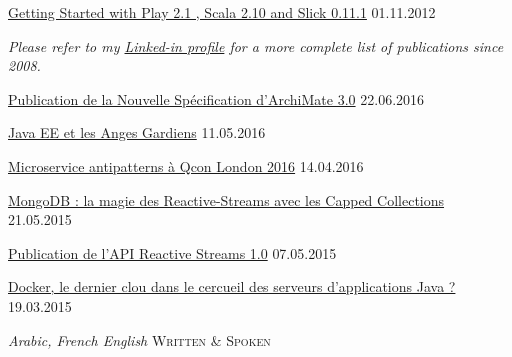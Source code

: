 \documentclass[10pt,a4paper]{article}
\begin{document}
\headedsection
  {\href{http://java.dzone.com/articles/getting-started-play-21-scala}{Getting Started with Play 2.1 , Scala 2.10 and Slick 0.11.1}}
  {\textsc{01.11.2012}}
  
\vspace{-0.2em}
\begin{center}
  \emph{\small Please refer to my \href{http://www.linkedin.com/in/ouertani}{Linked-in profile} for a more complete list of publications since 2008.}
\end{center}



\spacedhrule{0em}{-0.4em}


\headedsection
  {\href{https://www.infoq.com/fr/news/2016/06/archimate-3-0}{Publication de la Nouvelle Spécification d’ArchiMate 3.0}}
  {\textsc{22.06.2016}}

\headedsection
  {\href{https://www.infoq.com/fr/news/2016/05/java-ee-anges-gardiens}{Java EE et les Anges Gardiens}}
  {\textsc{11.05.2016}}
  
\headedsection
  {\href{https://www.infoq.com/fr/news/2016/03/microservice-antipatterns-qcon}{Microservice antipatterns à Qcon London 2016}}
  {\textsc{14.04.2016}}   
  
  
\headedsection
  {\href{http://www.infoq.com/fr/news/2015/05/reactive-streams-capped-collecti}{MongoDB : la magie des Reactive-Streams avec les Capped Collections}}
  {\textsc{21.05.2015}}   

\headedsection
  {\href{http://www.infoq.com/fr/news/2015/05/api-reactive-streams-1-0}{Publication de l’API Reactive Streams 1.0}}
  {\textsc{07.05.2015}} 

\headedsection
  {\href{http://www.infoq.com/fr/news/2015/03/docker-vs-serveurs-app-java}{Docker, le dernier clou dans le cercueil des serveurs d’applications Java ?}}
  {\textsc{19.03.2015}} 


\spacedhrule{0em}{-0.4em}

\headedsection
  {\sl Arabic, French English} 
  {\textsc{Written \& Spoken}} 
\end{document}
